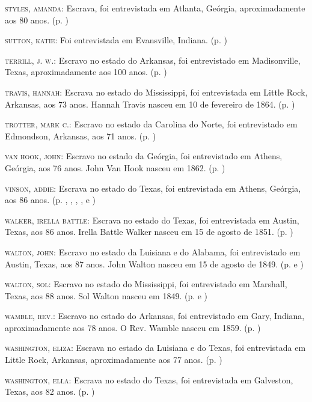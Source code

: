 \begin{Parskip}
\textsc{styles, amanda:} Escrava, foi entrevistada em Atlanta, Geórgia,
aproximadamente aos 80 anos. (p. \pageref{ref260})

\textsc{sutton, katie:} Foi entrevistada em Evansville, Indiana. (p. \pageref{ref261})

\textsc{terrill, j. w.:} Escravo no estado do Arkansas, foi entrevistado
em Madisonville, Texas, aproximadamente aos 100 anos. (p. \pageref{ref262})

\textsc{travis, hannah:} Escrava no estado do Mississippi, foi
entrevistada em Little Rock, Arkansas, aos 73 anos. Hannah Travis nasceu
em 10 de fevereiro de 1864. (p. \pageref{ref263})

\textsc{trotter, mark c.:} Escravo no estado da Carolina do Norte, foi
entrevistado em Edmondson, Arkansas, aos 71 anos. (p. \pageref{ref264})

\textsc{van hook, john:} Escravo no estado da Geórgia, foi entrevistado
em Athens, Geórgia, aos 76 anos. John Van Hook nasceu em 1862. (p. \pageref{ref265})

\textsc{vinson, addie:} Escrava no estado do Texas, foi entrevistada em
Athens, Geórgia, aos 86 anos. (p. \pageref{ref266}, \pageref{ref267}, \pageref{ref268}, \pageref{ref269}, \pageref{ref270} e \pageref{ref271})

\textsc{walker, irella battle:} Escrava no estado do Texas, foi
entrevistada em Austin, Texas, aos 86 anos. Irella Battle Walker nasceu
em 15 de agosto de 1851. (p. \pageref{ref272})

\textsc{walton, john:} Escravo no estado da Luisiana e do Alabama, foi
entrevistado em Austin, Texas, aos 87 anos. John Walton nasceu em 15 de
agosto de 1849. (p. \pageref{ref273} e \pageref{ref274})

\textsc{walton, sol:} Escravo no estado do Mississippi, foi entrevistado
em Marshall, Texas, aos 88 anos. Sol Walton nasceu em 1849. (p. \pageref{ref275} e \pageref{ref276})

\textsc{wamble, rev.:} Escravo no estado do Arkansas, foi entrevistado
em Gary, Indiana, aproximadamente aos 78 anos. O Rev. Wamble nasceu em
1859. (p. \pageref{ref277})

\textsc{washington, eliza:} Escrava no estado da Luisiana e do Texas,
foi entrevistada em Little Rock, Arkansas, aproximadamente aos 77 anos. (p. \pageref{ref278})

\textsc{washington, ella:} Escrava no estado do Texas, foi entrevistada
em Galveston, Texas, aos 82 anos. (p. \pageref{ref279})


\end{Parskip}
